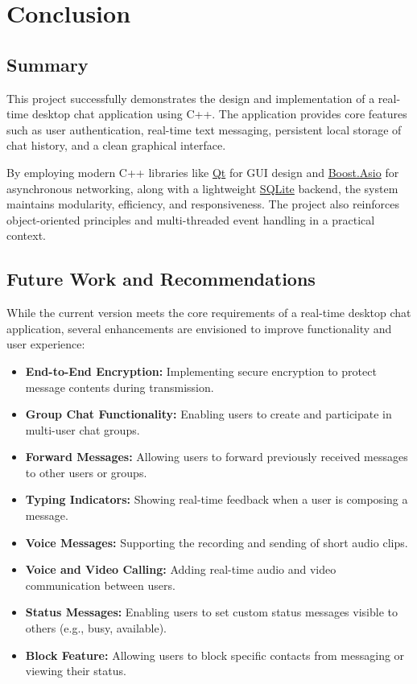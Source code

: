 \documentclass[12pt,a4paper]{article}
\begin{document}
  


\section{Conclusion}

\subsection{Summary}
This project successfully demonstrates the design and implementation of a real-time desktop chat application using C++. The application provides core features such as user authentication, real-time text messaging, persistent local storage of chat history, and a clean graphical interface.

By employing modern C++ libraries like \href{https://doc.qt.io/}{Qt} for GUI design and \href{https://www.boost.org/doc/libs/release/doc/html/boost_asio.html}{Boost.Asio} for asynchronous networking, along with a lightweight \href{https://www.sqlite.org/index.html}{SQLite} backend, the system maintains modularity, efficiency, and responsiveness. The project also reinforces object-oriented principles and multi-threaded event handling in a practical context.

\subsection{Future Work and Recommendations}
While the current version meets the core requirements of a real-time desktop chat application, several enhancements are envisioned to improve functionality and user experience:

\begin{itemize}[leftmargin=1.5em]
  \item \textbf{End-to-End Encryption:} Implementing secure encryption to protect message contents during transmission.
  \item \textbf{Group Chat Functionality:} Enabling users to create and participate in multi-user chat groups.
  \item \textbf{Forward Messages:} Allowing users to forward previously received messages to other users or groups.
  \item \textbf{Typing Indicators:} Showing real-time feedback when a user is composing a message.
  \item \textbf{Voice Messages:} Supporting the recording and sending of short audio clips.
  \item \textbf{Voice and Video Calling:} Adding real-time audio and video communication between users.
  \item \textbf{Status Messages:} Enabling users to set custom status messages visible to others (e.g., busy, available).
  \item \textbf{Block Feature:} Allowing users to block specific contacts from messaging or viewing their status.
\end{itemize}
\end{document}
